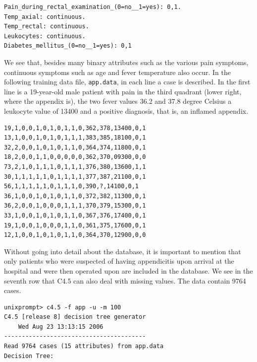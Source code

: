 \documentclass[10pt]{book}
\begin{document}
\begin{verbatim}
Pain_during_rectal_examination_(0=no__1=yes): 0,1.
Temp_axial: continuous.
Temp_rectal: continuous.
Leukocytes: continuous.
Diabetes_mellitus_(0=no__1=yes): 0,1
\end{verbatim}

We see that, besides many binary attributes such as the various pain symptoms, continuous symptoms such as age and fever temperature also occur. In the following training data file, \texttt{app.data}, in each line a case is described. In the first line is a 19-year-old male patient with pain in the third quadrant (lower right, where the appendix is), the two fever values 36.2 and 37.8 degree Celsius a leukocyte value of 13400 and a positive diagnosis, that is, an inflamed appendix.

\begin{verbatim}
19,1,0,0,1,0,1,0,1,1,0,362,378,13400,0,1
13,1,0,0,1,0,1,0,1,1,1,383,385,18100,0,1
32,2,0,0,1,0,1,0,1,1,0,364,374,11800,0,1
18,2,0,0,1,1,0,0,0,0,0,362,370,09300,0,0
73,2,1,0,1,1,1,0,1,1,1,376,380,13600,1,1
30,1,1,1,1,1,0,1,1,1,1,377,387,21100,0,1
56,1,1,1,1,1,0,1,1,1,0,390,?,14100,0,1
36,1,0,0,1,0,1,0,1,1,0,372,382,11300,0,1
36,2,0,0,1,0,0,0,1,1,1,370,379,15300,0,1
33,1,0,0,1,0,1,0,1,1,0,367,376,17400,0,1
19,1,0,0,1,0,0,0,1,1,0,361,375,17600,0,1
12,1,0,0,1,0,1,0,1,1,0,364,370,12900,0,0
\end{verbatim}

Without going into detail about the database, it is important to mention that only patients who were suspected of having appendicitis upon arrival at the hospital and were then operated upon are included in the database. We see in the seventh row that C4.5 can also deal with missing values. The data contain 9764 cases.

\begin{verbatim}
unixprompt> c4.5 -f app -u -m 100
C4.5 [release 8] decision tree generator
    Wed Aug 23 13:13:15 2006
----------------------------------------
Read 9764 cases (15 attributes) from app.data
Decision Tree:
\end{verbatim}
\end{document}
